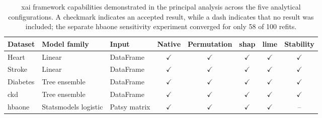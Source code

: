 \begin{table}[htbp]
    \centering
    \small
    \renewcommand{\arraystretch}{1.2}
    \setlength{\tabcolsep}{6pt}
    \caption{\gls{xai} framework capabilities demonstrated in the principal analysis across the five analytical configurations. A checkmark indicates an accepted result, while a dash indicates that no result was included; the separate \gls{hbaone} sensitivity experiment converged for only 58 of 100 refits.}
    \label{tab:framework_capabilities}
    \begin{tabular}{@{}lllccccc@{}}
        \toprule
        \textbf{Dataset}
        & \textbf{Model family}
        & \textbf{Input}
        & \textbf{Native}
        & \textbf{Permutation}
        & \textbf{\gls{shap}}
        & \textbf{\gls{lime}}
        & \textbf{Stability} \\
        \midrule
        Heart
        & Linear
        & DataFrame
        & $\checkmark$
        & $\checkmark$
        & $\checkmark$
        & $\checkmark$
        & $\checkmark$ \\

        Stroke
        & Linear
        & DataFrame
        & $\checkmark$
        & $\checkmark$
        & $\checkmark$
        & $\checkmark$
        & $\checkmark$ \\

        Diabetes
        & Tree ensemble
        & DataFrame
        & $\checkmark$
        & $\checkmark$
        & $\checkmark$
        & $\checkmark$
        & $\checkmark$ \\

        \gls{ckd}
        & Tree ensemble
        & DataFrame
        & $\checkmark$
        & $\checkmark$
        & $\checkmark$
        & $\checkmark$
        & $\checkmark$ \\

        \gls{hbaone}
        & Statsmodels logistic
        & Patsy matrix
        & $\checkmark$
        & $\checkmark$
        & $\checkmark$
        & $\checkmark$
        & -- \\
        \bottomrule
    \end{tabular}
\end{table}

